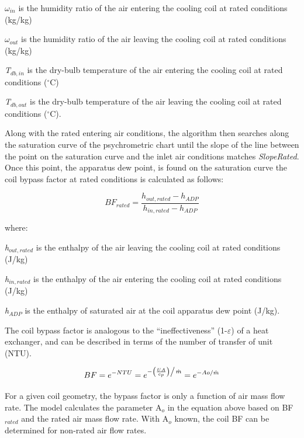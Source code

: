 \emph{\(\omega_{in}\)} is the humidity ratio of the air entering the cooling coil at rated conditions (kg/kg)

\emph{\(\omega_{out}\)} is the humidity ratio of the air leaving the cooling coil at rated conditions (kg/kg)

\emph{T\(_{db,in}\)} is the dry-bulb temperature of the air entering the cooling coil at rated conditions (\(^{\circ}\)C)

\emph{T\(_{db,out}\)} is the dry-bulb temperature of the air leaving the cooling coil at rated conditions (\(^{\circ}\)C).

Along with the rated entering air conditions, the algorithm then searches along the saturation curve of the psychrometric chart until the slope of the line between the point on the saturation curve and the inlet air conditions matches \emph{SlopeRated}. Once this point, the apparatus dew point, is found on the saturation curve the coil bypass factor at rated conditions is calculated as follows:

\begin{equation}
B{F_{rated}} = \frac{{{h_{out,rated}} - {h_{ADP}}}}{{{h_{in,rated}} - {h_{ADP}}}}
\end{equation}

where:

\emph{h\(_{out,rated}\)} is the enthalpy of the air leaving the cooling coil at rated conditions (J/kg)

\emph{h\(_{in,rated}\)} is the enthalpy of the air entering the cooling coil at rated conditions (J/kg)

\emph{h\(_{ADP}\)} is the enthalpy of saturated air at the coil apparatus dew point (J/kg).

The coil bypass factor is analogous to the ``ineffectiveness'' (1-\(\varepsilon\)) of a heat exchanger, and can be described in terms of the number of transfer of unit (NTU).

\begin{equation}
BF = {e^{ - NTU}} = {e^{{{ - \left( {\frac{{UA}}{{{c_p}}}} \right)} \mathord{\left/ {\vphantom {{ - \left( {\frac{{UA}}{{{c_p}}}} \right)} {\dot m}}} \right. } {\dot m}}}} = {e^{ - Ao/\dot m}}
\end{equation}

For a given coil geometry, the bypass factor is only a function of air mass flow rate. The model calculates the parameter A\(_{o}\) in the equation above based on BF\(_{rated}\) and the rated air mass flow rate. With A\(_{o}\) known, the coil BF can be determined for non-rated air flow rates.


